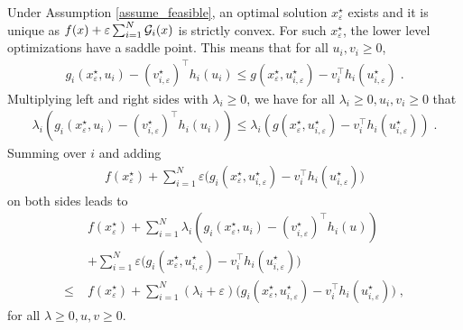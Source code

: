 \documentclass[journal,twoside,web]{ieeecolor}
\begin{document}
Under Assumption \ref{assume_feasible}, an optimal solution $x_\varepsilon^\star$ exists and it is unique as $f(x)+\varepsilon\sum_{i=1}^N{\cal G}_i(x)$ is strictly convex. For such $x_\varepsilon^\star$, the lower level optimizations have a saddle point.
This means that for all $u_i,v_i\geq 0$\;,
\begin{align} \label{lowsadl1.eq_perturbed}
g_i(x_\varepsilon^\star,u_i)-(v_{i,\varepsilon}^\star)^\top h_i(u_i)\leq g(x_\varepsilon^\star,u_{i,\varepsilon}^\star)-v_i^\top h_i(u_{i,\varepsilon}^\star)\;.
\end{align}
Multiplying left and right sides with $\lambda_i\geq 0$, we have for all $\lambda_i\geq 0, u_i,v_i\geq 0$ that
\begin{align*}
\lambda_i(g_i(x_\varepsilon^\star,u_i)-(v_{i,\varepsilon}^\star)^\top h_i(u_i))\leq \lambda_i(g(x_\varepsilon^\star,u_{i,\varepsilon}^\star)-v_i^\top h_i(u_{i,\varepsilon}^\star))\;.
\end{align*}
Summing over $i$ and adding
\begin{align*}
f(x_\varepsilon^\star)+\sum_{i=1}^N \varepsilon \big(g_i(x_\varepsilon^\star,u_{i,\varepsilon}^\star)-v_i^\top h_i(u_{i,\varepsilon}^\star)\big)
\end{align*}
on both sides leads to
\begin{align}
&f(x_\varepsilon^\star)+\sum_{i=1}
^N\lambda_i(g_i(x_\varepsilon^\star,u_i)- (v_{i,\varepsilon}^\star)^\top h_i(u)) \nonumber\\
&+\sum_{i=1}^N \varepsilon \big(g_i(x_\varepsilon^\star,u_{i,\varepsilon}^\star)-v_i^\top h_i(u_{i,\varepsilon}^\star)\big) \nonumber\\
\leq \; &f(x_\varepsilon^\star)+\sum_{i=1}^N (\lambda_i+\varepsilon) \big(g_i(x_\varepsilon^\star,u_{i,\varepsilon}^\star)-v_i^\top h_i(u_{i,\varepsilon}^\star)\big)\;, \label{sadl1.eq_perturbed}
\end{align}
for all $\lambda\geq 0,u,v\geq 0$\;.
\end{document}
